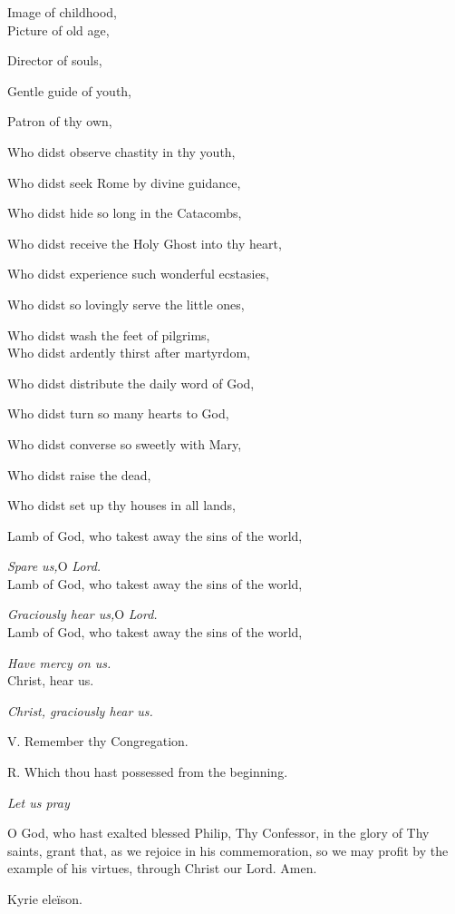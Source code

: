 Image of childhood,\emph{}\\
Picture of old age,

Director of souls,

Gentle guide of youth,

Patron of thy own,

Who didst observe chastity in thy youth,

Who didst seek Rome by divine guidance,

Who didst hide so long in the Catacombs,

Who didst receive the Holy Ghost into thy heart,

Who didst experience such wonderful ecstasies,

Who didst so lovingly serve the little ones,

Who didst wash the feet of pilgrims,\emph{}\\
Who didst ardently thirst after martyrdom,

Who didst distribute the daily word of God,

Who didst turn so many hearts to God,

Who didst converse so sweetly with Mary,

Who didst raise the dead,

Who didst set up thy houses in all lands,

Lamb of God, who takest away the
sins of the world,

\emph{Spare us,}O \emph{Lord.}\\
Lamb of God, who takest away the sins of the world,

\emph{Graciously hear us,}O \emph{Lord.}\\
Lamb of God, who takest away the sins of the world,

\emph{Have mercy on us.}\\
Christ, hear us.

\emph{Christ, graciously hear us.}

V. Remember thy Congregation.

R. Which thou hast possessed from the beginning.

\emph{Let
us pray}

O God, who hast exalted blessed
Philip, Thy Confessor, in the glory of Thy saints, grant that, as we
rejoice in his commemoration, so we may profit by the example of his
virtues, through Christ our Lord. Amen.


Kyrie eleïson.

